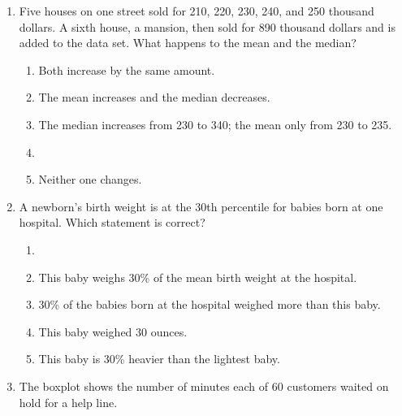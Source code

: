 \documentclass[12pt]{article}
\begin{document}
\begin{enumerate}[leftmargin=1.9em, itemsep=0.13in]
  \boxguard[11]
  \item Five houses on one street sold for 210, 220, 230, 240, and 250 thousand dollars. A
        sixth house, a mansion, then sold for 890 thousand dollars and is added to the data
        set. What happens to the mean and the median?
        \begin{enumerate}[label=\textbf{(\Alph*)}, leftmargin=2.2em, itemsep=2pt]
          \item Both increase by the same amount.
          \item The mean increases and the median decreases.
          \item The median increases from 230 to 340; the mean only from 230 to 235.
          \item {}
          \item Neither one changes.\hfill{}\rule[-0.2in]{0pt}{0.48in}
        \end{enumerate}

  \boxguard[10]
  \item A newborn's birth weight is at the 30th percentile for babies born at one hospital.
        Which statement is correct?
        \begin{enumerate}[label=\textbf{(\Alph*)}, leftmargin=2.2em, itemsep=2pt]
          \item {}
          \item This baby weighs 30\% of the mean birth weight at the hospital.
          \item 30\% of the babies born at the hospital weighed more than this baby.
          \item This baby weighed 30 ounces.
          \item This baby is 30\% heavier than the lightest baby.\hfill{}\rule[-0.2in]{0pt}{0.48in}
        \end{enumerate}

  \boxguard[16]
  \item The boxplot shows the number of minutes each of 60 customers waited on hold for a
        help line.


\end{enumerate}
\end{document}

